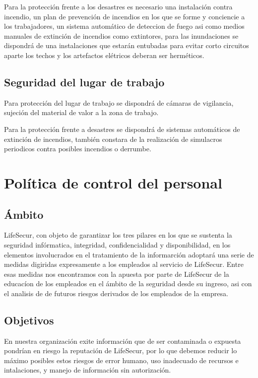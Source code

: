 \documentclass[11pt,bibtotoc,noliststotoc,BCOR0mm]{scrbook}
\begin{document}
Para la protección frente a los desastres es necesario una instalación contra incendio, un plan de prevención de incendios en los que se forme y conciencie a los trabajadores, un sistema automático de deteccion de fuego asi como medios manuales de extinción de incendios como extintores, para las inundaciones se dispondrá de una instalaciones que estarán entubadas para evitar corto circuitos aparte los techos y los artefactos elétricos deberan ser herméticos.


\section{Seguridad del lugar de trabajo}

Para protección del lugar de trabajo se dispondrá de cámaras de vigilancia, sujeción del material de valor a la zona de trabajo.

Para la protección frente a desastres  se dispondrá de sistemas automáticos de extinción de incendios, también constara de la realización de simulacros periodicos contra posibles incendios o derrumbe.



\chapter{Política de control del personal}

\section{Ámbito}

LifeSecur, con objeto de garantizar los tres pilares en los que se sustenta la seguridad infórmatica, integridad, confidencialidad y disponibilidad, en los elementos involucrados en el tratamiento de la informarción adoptará una serie de medidas digiridas expresamente a los empleados al servicio de  LifeSecur. Entre esas medidas nos encontramos con la apuesta por parte de LifeSecur de la  educacíon de los empleados en el ámbito de la seguridad desde su ingreso, asi con el analisis de de futuros riesgos derivados de los empleados de la empresa.

\section{Objetivos}

En nuestra organización exite información que de ser contaminada o expuesta pondrían en riesgo la reputación de LifeSecur, por lo que debemos reducir lo máximo posibles estos riesgos de error humano, uso inadecuado de recursos e intalaciones, y manejo de información sin autorización.
\end{document}
